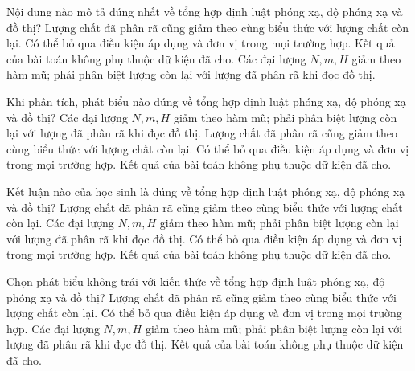 \begin{ex}
Nội dung nào mô tả đúng nhất về tổng hợp định luật phóng xạ, độ phóng xạ và đồ thị?
\choice
{Lượng chất đã phân rã cũng giảm theo cùng biểu thức với lượng chất còn lại.}
{Có thể bỏ qua điều kiện áp dụng và đơn vị trong mọi trường hợp.}
{Kết quả của bài toán không phụ thuộc dữ kiện đã cho.}
{\True Các đại lượng $N,m,H$ giảm theo hàm mũ; phải phân biệt lượng còn lại với lượng đã phân rã khi đọc đồ thị.}
\end{ex}

\begin{ex}
Khi phân tích, phát biểu nào đúng về tổng hợp định luật phóng xạ, độ phóng xạ và đồ thị?
\choice
{\True Các đại lượng $N,m,H$ giảm theo hàm mũ; phải phân biệt lượng còn lại với lượng đã phân rã khi đọc đồ thị.}
{Lượng chất đã phân rã cũng giảm theo cùng biểu thức với lượng chất còn lại.}
{Có thể bỏ qua điều kiện áp dụng và đơn vị trong mọi trường hợp.}
{Kết quả của bài toán không phụ thuộc dữ kiện đã cho.}
\end{ex}

\begin{ex}
Kết luận nào của học sinh là đúng về tổng hợp định luật phóng xạ, độ phóng xạ và đồ thị?
\choice
{Lượng chất đã phân rã cũng giảm theo cùng biểu thức với lượng chất còn lại.}
{\True Các đại lượng $N,m,H$ giảm theo hàm mũ; phải phân biệt lượng còn lại với lượng đã phân rã khi đọc đồ thị.}
{Có thể bỏ qua điều kiện áp dụng và đơn vị trong mọi trường hợp.}
{Kết quả của bài toán không phụ thuộc dữ kiện đã cho.}
\end{ex}

\begin{ex}
Chọn phát biểu không trái với kiến thức về tổng hợp định luật phóng xạ, độ phóng xạ và đồ thị?
\choice
{Lượng chất đã phân rã cũng giảm theo cùng biểu thức với lượng chất còn lại.}
{Có thể bỏ qua điều kiện áp dụng và đơn vị trong mọi trường hợp.}
{\True Các đại lượng $N,m,H$ giảm theo hàm mũ; phải phân biệt lượng còn lại với lượng đã phân rã khi đọc đồ thị.}
{Kết quả của bài toán không phụ thuộc dữ kiện đã cho.}
\end{ex}

